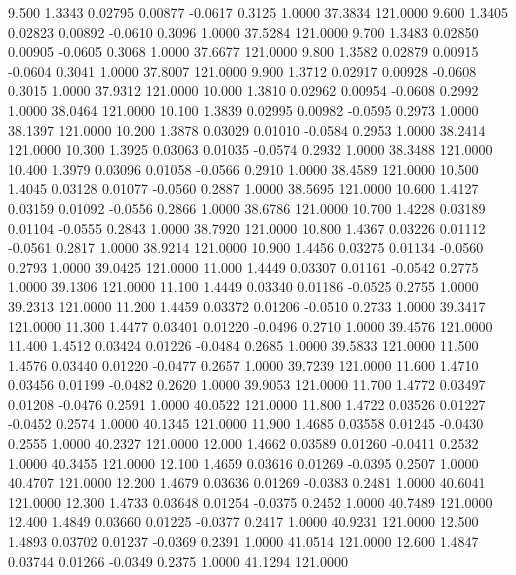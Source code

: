    9.500   1.3343   0.02795   0.00877  -0.0617   0.3125   1.0000  37.3834 121.0000
   9.600   1.3405   0.02823   0.00892  -0.0610   0.3096   1.0000  37.5284 121.0000
   9.700   1.3483   0.02850   0.00905  -0.0605   0.3068   1.0000  37.6677 121.0000
   9.800   1.3582   0.02879   0.00915  -0.0604   0.3041   1.0000  37.8007 121.0000
   9.900   1.3712   0.02917   0.00928  -0.0608   0.3015   1.0000  37.9312 121.0000
  10.000   1.3810   0.02962   0.00954  -0.0608   0.2992   1.0000  38.0464 121.0000
  10.100   1.3839   0.02995   0.00982  -0.0595   0.2973   1.0000  38.1397 121.0000
  10.200   1.3878   0.03029   0.01010  -0.0584   0.2953   1.0000  38.2414 121.0000
  10.300   1.3925   0.03063   0.01035  -0.0574   0.2932   1.0000  38.3488 121.0000
  10.400   1.3979   0.03096   0.01058  -0.0566   0.2910   1.0000  38.4589 121.0000
  10.500   1.4045   0.03128   0.01077  -0.0560   0.2887   1.0000  38.5695 121.0000
  10.600   1.4127   0.03159   0.01092  -0.0556   0.2866   1.0000  38.6786 121.0000
  10.700   1.4228   0.03189   0.01104  -0.0555   0.2843   1.0000  38.7920 121.0000
  10.800   1.4367   0.03226   0.01112  -0.0561   0.2817   1.0000  38.9214 121.0000
  10.900   1.4456   0.03275   0.01134  -0.0560   0.2793   1.0000  39.0425 121.0000
  11.000   1.4449   0.03307   0.01161  -0.0542   0.2775   1.0000  39.1306 121.0000
  11.100   1.4449   0.03340   0.01186  -0.0525   0.2755   1.0000  39.2313 121.0000
  11.200   1.4459   0.03372   0.01206  -0.0510   0.2733   1.0000  39.3417 121.0000
  11.300   1.4477   0.03401   0.01220  -0.0496   0.2710   1.0000  39.4576 121.0000
  11.400   1.4512   0.03424   0.01226  -0.0484   0.2685   1.0000  39.5833 121.0000
  11.500   1.4576   0.03440   0.01220  -0.0477   0.2657   1.0000  39.7239 121.0000
  11.600   1.4710   0.03456   0.01199  -0.0482   0.2620   1.0000  39.9053 121.0000
  11.700   1.4772   0.03497   0.01208  -0.0476   0.2591   1.0000  40.0522 121.0000
  11.800   1.4722   0.03526   0.01227  -0.0452   0.2574   1.0000  40.1345 121.0000
  11.900   1.4685   0.03558   0.01245  -0.0430   0.2555   1.0000  40.2327 121.0000
  12.000   1.4662   0.03589   0.01260  -0.0411   0.2532   1.0000  40.3455 121.0000
  12.100   1.4659   0.03616   0.01269  -0.0395   0.2507   1.0000  40.4707 121.0000
  12.200   1.4679   0.03636   0.01269  -0.0383   0.2481   1.0000  40.6041 121.0000
  12.300   1.4733   0.03648   0.01254  -0.0375   0.2452   1.0000  40.7489 121.0000
  12.400   1.4849   0.03660   0.01225  -0.0377   0.2417   1.0000  40.9231 121.0000
  12.500   1.4893   0.03702   0.01237  -0.0369   0.2391   1.0000  41.0514 121.0000
  12.600   1.4847   0.03744   0.01266  -0.0349   0.2375   1.0000  41.1294 121.0000
